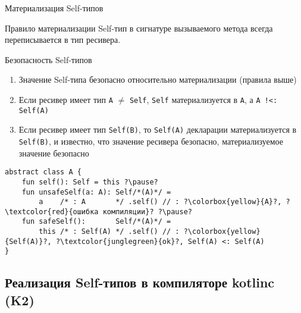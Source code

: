 \documentclass[handout,aspectratio=169,usenames,dvipsnames]{beamer}
\begin{document}
    \begin{frame}[fragile]{Материализация Self-типов}
        \begin{block}{Правило материализации}
            Self-тип в сигнатуре вызываемого метода всегда переписывается в тип ресивера.
        \end{block}
        \pause
        \begin{block}{Безопасность Self-типов}
            \begin{enumerate}
                \item Значение Self-типа безопасно относительно материализации (правила выше)
                \item Если ресивер имеет тип \texttt{A} $\neq$ \texttt{Self}, \texttt{Self} материализуется в \texttt{A}, а \texttt{A !<: Self(A)}
                \item Если ресивер имеет тип \texttt{Self(B)}, то \texttt{Self(A)} декларации материализуется в \texttt{Self(B)}, и известно, что значение ресивера безопасно, материализуемое значение безопасно
            \end{enumerate} \pause
            \begin{verbatim}
abstract class A {
    fun self(): Self = this ?\pause?
    fun unsafeSelf(a: A): Self/*(A)*/ =
        a    /* : A       */ .self() // : ?\colorbox{yellow}{A}?, ?\textcolor{red}{ошибка компиляции}? ?\pause?
    fun safeSelf():       Self/*(A)*/ =
        this /* : Self(A) */ .self() // : ?\colorbox{yellow}{Self(A)}?, ?\textcolor{junglegreen}{ok}?, Self(A) <: Self(A)
}
            \end{verbatim}
        \end{block}
    \end{frame}

    \subsection{Реализация Self-типов в компиляторе kotlinc (K2)}
\end{document}
